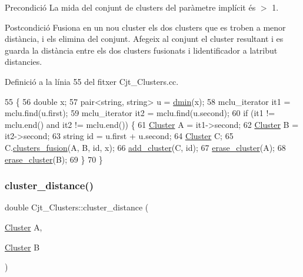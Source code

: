 \begin{DoxyPrecond}{Precondició}
La mida del conjunt de clusters del paràmetre implícit és $>$ 1. 
\end{DoxyPrecond}
\begin{DoxyPostcond}{Postcondició}
Fusiona en un nou cluster els dos clusters que es troben a menor distància, i els elimina del conjunt. Afegeix al conjunt el cluster resultant i es guarda la distància entre els dos clusters fusionats i l\textquotesingle{}identificador a l\textquotesingle{}atribut distancies. 
\end{DoxyPostcond}


Definició a la línia 55 del fitxer Cjt\+\_\+\+Clusters.\+cc.


\begin{DoxyCode}
55                                    \{
56     \textcolor{keywordtype}{double} x;
57     pair<string, string> u = \hyperlink{class_cjt___clusters_a3db57ec9903b4f5439679ac9ba41fab1}{dmin}(x);
58     mclu\_iterator it1 = mclu.find(u.first);
59     mclu\_iterator it2 = mclu.find(u.second);
60     \textcolor{keywordflow}{if} (it1 != mclu.end() and it2 != mclu.end()) \{
61         \hyperlink{class_cluster}{Cluster} A = it1->second;
62         \hyperlink{class_cluster}{Cluster} B = it2->second;
63         \textcolor{keywordtype}{string} \textcolor{keywordtype}{id} = u.first + u.second;
64         \hyperlink{class_cluster}{Cluster} C;
65         C.\hyperlink{class_cluster_a6b25af7d4f702db942878dba136fe0c2}{clusters\_fusion}(A, B, \textcolor{keywordtype}{id}, x);
66         \hyperlink{class_cjt___clusters_ace64164c455de6b3e91b774ad95d93ac}{add\_cluster}(C, \textcolor{keywordtype}{id});
67         \hyperlink{class_cjt___clusters_a779452d093c92ec42e47987a84ea48ff}{erase\_cluster}(A);
68         \hyperlink{class_cjt___clusters_a779452d093c92ec42e47987a84ea48ff}{erase\_cluster}(B);
69     \}
70 \}
\end{DoxyCode}
\mbox{\label{class_cjt___clusters_acd0e381a6b4c43933b3c6761febf9b3e}} 
\subsubsection{\texorpdfstring{cluster\+\_\+distance()}{cluster\_distance()}}
{\footnotesize\ttfamily double Cjt\+\_\+\+Clusters\+::cluster\+\_\+distance (\begin{DoxyParamCaption}\item[{\hyperlink{class_cluster}{Cluster}}]{A,  }\item[{\hyperlink{class_cluster}{Cluster}}]{B }\end{DoxyParamCaption})}



